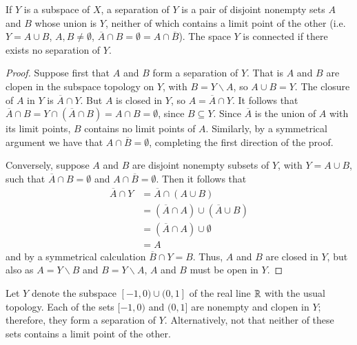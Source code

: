 \documentclass[12pt, a4paper, oneside, openright, titlepage]{book}
\begin{document}
\begin{lem}
    If $Y$ is a subspace of $X$, a separation of $Y$ is a pair of disjoint nonempty sets $A$ and $B$ whose union is $Y$, neither of which contains a limit point of the other (i.e. $Y = A \cup B$, $A,B\neq \emptyset$, $\overline{A}\cap B = \emptyset = A\cap \overline{B}$). The space $Y$ is connected if there exists no separation of $Y$.
\end{lem}
\begin{proof}
    Suppose first that $A$ and $B$ form a separation of $Y$. That is $A$ and $B$ are clopen in the subspace topology on $Y$, with $B = Y\backslash A$, so $A \cup B = Y$. The closure of $A$ in $Y$ is $\overline{A} \cap Y$. But $A$ is closed in $Y$, so $A = \overline{A}\cap Y$. It follows that $\overline{A}\cap B = Y\cap (\overline{A}\cap B) = A\cap B = \emptyset$, since $B \subseteq Y$. Since $\overline{A}$ is the union of $A$ with its limit points, $B$ contains no limit points of $A$. Similarly, by a symmetrical argument we have that $A\cap \overline{B} = \emptyset$, completing the first direction of the proof.

    Conversely, suppose $A$ and $B$ are disjoint nonempty subsets of $Y$, with $Y = A\cup B$, such that $\overline{A} \cap B = \emptyset$ and $A\cap \overline{B} = \emptyset$. Then it follows that \begin{align*}
        \overline{A}\cap Y &= \overline{A}\cap (A\cup B) \\
        &= (\overline{A}\cap A)\cup(\overline{A}\cup B) \\
        &= (\overline{A}\cap A)\cup \emptyset \\
        &= A
    \end{align*}
    and by a symmetrical calculation $\overline{B}\cap Y = B$. Thus, $A$ and $B$ are closed in $Y$, but also as $A = Y\backslash B$ and $B = Y\backslash A$, $A$ and $B$ must be open in $Y$.
\end{proof}

\begin{eg}
    Let $Y$ denote the subspace $[-1,0)\cup(0,1]$ of the real line $\mathbb R$ with the usual topology. Each of the sets $[-1,0)$ and $(0,1]$ are nonempty and clopen in $Y$; therefore, they form a separation of $Y$. Alternatively, not that neither of these sets contains a limit point of the other.
\end{eg}
\end{document}
